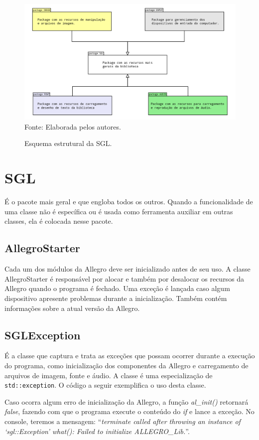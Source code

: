 %
%
%
%
\begin{figure}[H]
    \centering
     \caption{Esquema estrutural da SGL. }
    \label{pacotes}
    \includegraphics[scale = 0.2]{Imagens/pacotes.png}
    \\Fonte: Elaborada pelos autores.
\end{figure}
%
%
%
\section{SGL}
%
%
É o pacote mais geral e que engloba todos os outros. Quando a funcionalidade de uma classe não é específica ou é usada como ferramenta auxiliar em outras classes, ela é colocada nesse pacote.
%
\subsection{AllegroStarter}
%
Cada um dos módulos da Allegro deve ser inicializado antes de seu uso. A classe AllegroStarter é responsável por alocar e também por desalocar os recursos da Allegro quando o programa é fechado. Uma exceção é lançada caso algum dispositivo apresente problemas durante a inicialização. Também contém informações sobre a atual versão da Allegro. 
%
%
\subsection{SGLException}
%
É a classe que captura e trata as exceções que possam ocorrer durante a execução do programa, como inicialização dos componentes da Allegro e carregamento de arquivos de imagem, fonte e áudio. A classe é uma especialização de \texttt{std::exception}. O código a seguir exemplifica o uso desta classe.
%

%
\par 
Caso ocorra algum erro de inicialização da Allegro, a função \textit{al\_init()} retornará \textit{false}, fazendo com que o programa execute o conteúdo do \textit{if} e lance a exceção. No console, teremos a mensagem:  ``\textit{terminate called after throwing an instance of `sgl::Exception'
what(): Failed to initialize ALLEGRO\_Lib.}''.
%
%
